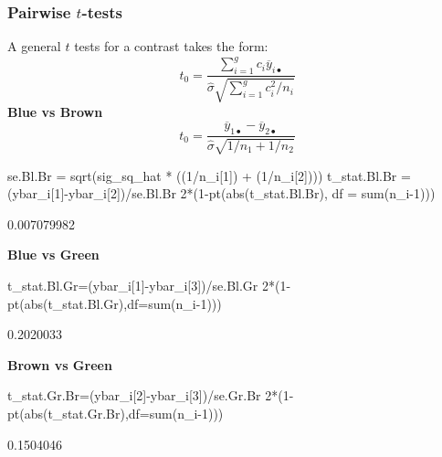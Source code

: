 \documentclass[a4paper]{article}\usepackage[]{graphicx}\usepackage[]{xcolor}
\begin{document}
\subsubsection{Pairwise \( t \)-tests}
A general \( t \) tests for a contrast takes the form:
\[
	t_0 = \frac{\sum_{i=1}^g c_i \overline{y}_{i\bullet}}{\hat{\sigma} \sqrt{\sum_{i=1}^g c_i^2/n_i}}
\]
\textbf{Blue vs Brown}
\[
	t_0 = \frac{\overline{y}_{1\bullet} - \overline{y}_{2\bullet}}{\hat{\sigma} \sqrt{1/n_1 + 1/n_2}}
\]
\begin{Schunk}
\begin{Sinput}
se.Bl.Br = sqrt(sig_sq_hat *
                  ((1/n_i[1]) + (1/n_i[2])))
t_stat.Bl.Br = (ybar_i[1]-ybar_i[2])/se.Bl.Br
2*(1-pt(abs(t_stat.Bl.Br), df = sum(n_i-1)))
\end{Sinput}
\begin{Soutput}
[1] 0.007079982
\end{Soutput}
\end{Schunk}
\textbf{Blue vs Green}
\begin{Schunk}
\begin{Sinput}
t_stat.Bl.Gr=(ybar_i[1]-ybar_i[3])/se.Bl.Gr
2*(1-pt(abs(t_stat.Bl.Gr),df=sum(n_i-1)))
\end{Sinput}
\begin{Soutput}
[1] 0.2020033
\end{Soutput}
\end{Schunk}
\textbf{Brown vs Green}
\begin{Schunk}
\begin{Sinput}
t_stat.Gr.Br=(ybar_i[2]-ybar_i[3])/se.Gr.Br
2*(1-pt(abs(t_stat.Gr.Br),df=sum(n_i-1)))
\end{Sinput}
\begin{Soutput}
[1] 0.1504046
\end{Soutput}
\end{Schunk}
\end{document}
